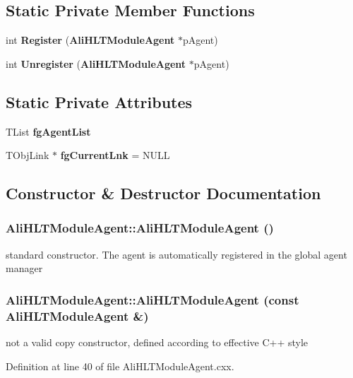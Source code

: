 \subsection*{Static Private Member Functions}
\begin{CompactItemize}
\item 
int {\bf Register} ({\bf Ali\-HLTModule\-Agent} $\ast$p\-Agent)
\item 
int {\bf Unregister} ({\bf Ali\-HLTModule\-Agent} $\ast$p\-Agent)
\end{CompactItemize}
\subsection*{Static Private Attributes}
\begin{CompactItemize}
\item 
TList {\bf fg\-Agent\-List}
\item 
TObj\-Link $\ast$ {\bf fg\-Current\-Lnk} = NULL
\end{CompactItemize}


\subsection{Constructor \& Destructor Documentation}
\subsubsection{\setlength{\rightskip}{0pt plus 5cm}Ali\-HLTModule\-Agent::Ali\-HLTModule\-Agent ()}\label{classAliHLTModuleAgent_a0}


standard constructor. The agent is automatically registered in the global agent manager 
\subsubsection{\setlength{\rightskip}{0pt plus 5cm}Ali\-HLTModule\-Agent::Ali\-HLTModule\-Agent (const {\bf Ali\-HLTModule\-Agent} \&)}\label{classAliHLTModuleAgent_a1}


not a valid copy constructor, defined according to effective C++ style 

Definition at line 40 of file Ali\-HLTModule\-Agent.cxx.

